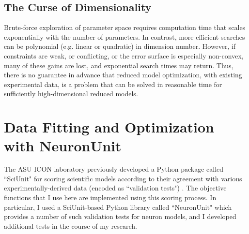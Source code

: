 \subsection{The Curse of Dimensionality}
Brute-force exploration of parameter space requires computation time that scales exponentially with the number of parameters.  In contrast, more efficient searches can be polynomial (e.g. linear or quadratic) in dimension number.  However, if constraints are weak, or conflicting, or the error surface is especially non-convex, many of these gains are lost, and exponential search times may return.  Thus, there is no guarantee in advance that reduced model optimization, with existing experimental data, is a problem that can be solved in reasonable time for sufficiently high-dimensional reduced models.

\section{Data Fitting and Optimization with NeuronUnit}
\label{sec:neuronunit}
The ASU ICON laboratory previously developed a Python package called ``SciUnit" for scoring scientific models according to their agreement with various experimentally-derived data (encoded as ``validation tests") \citep{omar2014collaborative}.  The objective functions that I use here are implemented using this scoring process.
In particular, I used a SciUnit-based Python library called ``NeuronUnit" which provides a number of such validation tests for neuron models, and I developed additional tests in the course of my research.

